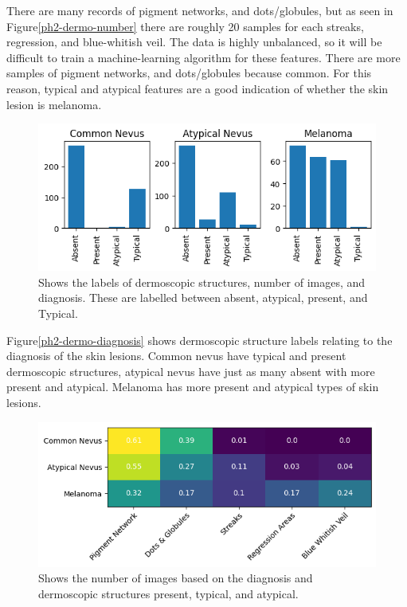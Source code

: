 There are many records of pigment networks, and dots/globules, but as seen in Figure\ref{ph2-dermo-number} there are roughly 20 samples for each streaks, regression, and blue-whitish veil. The data is highly unbalanced, so it will be difficult to train a machine-learning algorithm for these features. There are more samples of pigment networks, and dots/globules because common. For this reason, typical and atypical features are a good indication of whether the skin lesion is melanoma.

\begin{figure}
	\centering
	\includegraphics[scale=0.75]{images/ph2/ph2-dermo-diagnosis.png}
	\caption{Shows the labels of dermoscopic structures, number of images, and diagnosis. These are labelled between absent, atypical, present, and Typical.}
\end{figure}\label{ph2-dermo-diagnosis}

Figure\ref{ph2-dermo-diagnosis} shows dermoscopic structure labels relating to the diagnosis of the skin lesions. Common nevus have typical and present dermoscopic structures, atypical nevus have just as many absent with more present and atypical. Melanoma has more present and atypical types of skin lesions.

\begin{figure}
	\centering
	\includegraphics[scale=0.75]{images/ph2/ph2-diagnosis-dermo-heat.png}
	\caption{Shows the number of images based on the diagnosis and dermoscopic structures present, typical, and atypical.}
\end{figure}\label{ph2-diagnosis-dermo}


